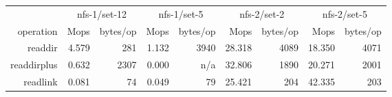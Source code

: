 \begin{table*}
\begin{tabular}{|r||r|r||r|r||r|r||r|r|}
\hline
  & \multicolumn{2}{c||}{nfs-1/set-12} & \multicolumn{2}{c||}{nfs-1/set-5} & \multicolumn{2}{c||}{nfs-2/set-2} & \multicolumn{2}{c|}{nfs-2/set-5} \\
   operation &   Mops & bytes/op &   Mops & bytes/op &   Mops & bytes/op &   Mops & bytes/op \\
     readdir &     4.579 &   281 &     1.132 &  3940 &    28.318 &  4089 &    18.350 &  4071 \\
 readdirplus &     0.632 &  2307 &     0.000 &  n/a  &    32.806 &  1890 &    20.271 &  2001 \\
    readlink &     0.081 &    74 &     0.049 &    79 &    25.421 &   204 &    42.335 &   203 \\

\end{tabular}
\end{table*}
